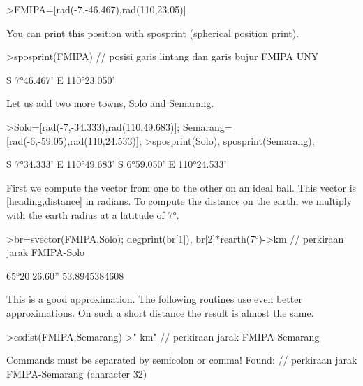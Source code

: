 \documentclass{article}
\begin{document}
\begin{eulernotebook}
\begin{eulercomment}
\begin{eulercomment}
\begin{eulercomment}
\begin{eulercomment}
\begin{eulercomment}
\begin{eulercomment}
\begin{eulercomment}
\begin{eulercomment}
\begin{eulerprompt}
>FMIPA=[rad(-7,-46.467),rad(110,23.05)]
\end{eulerprompt}
\begin{euleroutput}
  [-0.13569,  1.92657]
\end{euleroutput}
\begin{eulercomment}
You can print this position with sposprint (spherical position print).
\end{eulercomment}
\begin{eulerprompt}
>sposprint(FMIPA) // posisi garis lintang dan garis bujur FMIPA UNY
\end{eulerprompt}
\begin{euleroutput}
  S 7°46.467' E 110°23.050'
\end{euleroutput}
\begin{eulercomment}
Let us add two more towns, Solo and Semarang.
\end{eulercomment}
\begin{eulerprompt}
>Solo=[rad(-7,-34.333),rad(110,49.683)]; Semarang=[rad(-6,-59.05),rad(110,24.533)];
>sposprint(Solo), sposprint(Semarang),
\end{eulerprompt}
\begin{euleroutput}
  S 7°34.333' E 110°49.683'
  S 6°59.050' E 110°24.533'
\end{euleroutput}
\begin{eulercomment}
First we compute the vector from one to the other on an ideal ball. This vector is
[heading,distance] in radians. To compute the distance on the earth, we multiply with the
earth radius at a latitude of 7°.
\end{eulercomment}
\begin{eulerprompt}
>br=svector(FMIPA,Solo); degprint(br[1]), br[2]*rearth(7°)->km // perkiraan jarak FMIPA-Solo
\end{eulerprompt}
\begin{euleroutput}
  65°20'26.60''
  53.8945384608
\end{euleroutput}
\begin{eulercomment}
This is a good approximation. The following routines use even better
approximations. On such a short distance the result is almost the
same.
\end{eulercomment}
\begin{eulerprompt}
>esdist(FMIPA,Semarang)->" km" // perkiraan jarak FMIPA-Semarang
\end{eulerprompt}
\begin{euleroutput}
  Commands must be separated by semicolon or comma!
  Found:  // perkiraan jarak FMIPA-Semarang (character 32)

\end{euleroutput}
\end{eulercomment}
\end{eulercomment}
\end{eulercomment}
\end{eulercomment}
\end{eulercomment}
\end{eulercomment}
\end{eulercomment}
\end{eulercomment}
\end{eulernotebook}
\end{document}
